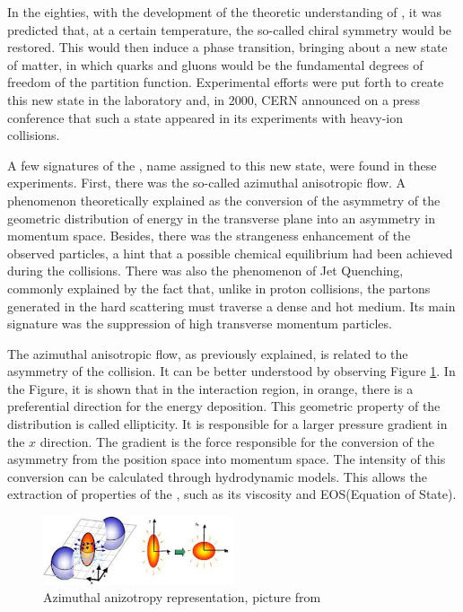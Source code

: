 \par
In the eighties\cite{letessier_hadrons_2002}, with the development of the theoretic understanding of \qcd, it was predicted that, at a certain temperature, the so-called chiral symmetry would be restored. This would then induce a phase transition, bringing about a new state of matter, in which quarks and gluons would be the fundamental degrees of freedom of the partition function. Experimental efforts were put forth to create this new state in the laboratory and, in 2000, CERN announced on a press conference that such a state appeared in its experiments with heavy-ion collisions\citep{letessier_hadrons_2002}.
\par
A few signatures of the \qgp, name assigned to this new state, were found in these experiments\cite{letessier_hadrons_2002}. First, there was the so-called azimuthal anisotropic flow. A phenomenon theoretically explained as the conversion of the asymmetry of the geometric distribution of energy in the transverse plane into an asymmetry in momentum space. Besides, there was the strangeness enhancement of the observed particles, a hint that a possible chemical equilibrium had been achieved during the collisions. There was also the phenomenon of Jet Quenching, commonly explained by the fact that, unlike in proton collisions, the partons generated in the hard scattering must traverse a dense and hot medium. Its main signature was the suppression of high transverse momentum particles.
\par
The azimuthal anisotropic flow, as previously explained, is related to the asymmetry of the collision. It can be better understood by observing Figure \ref{v2}. In the Figure, it is shown that in the interaction region, in orange, there is a preferential direction for the energy deposition. This geometric property of the distribution is called ellipticity. It is responsible for a larger pressure gradient in the $x$ direction. The gradient is the force responsible for the conversion of the asymmetry from the position space into momentum space. The intensity of this conversion can be calculated through hydrodynamic models. This allows the extraction of properties of the \qgp, such as its viscosity and EOS(Equation of State).

\begin{figure}
\includegraphics[width=0.5\textwidth]{images/index.jpeg}
\caption[Azimuthal anizotropy representation]{Azimuthal anizotropy representation, picture from \cite{ferrer_exploring_2016}}
\label{v2}
\end{figure}

